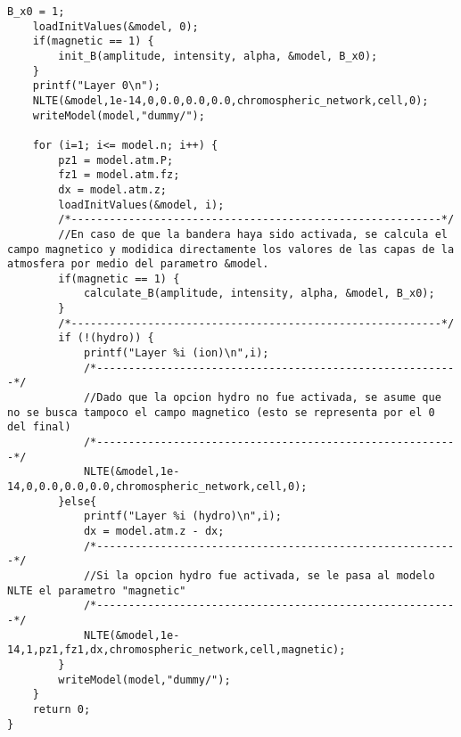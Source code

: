 \begin{lstlisting}[style=CStyle]
	B_x0 = 1;
	loadInitValues(&model, 0);
	if(magnetic == 1) {
		init_B(amplitude, intensity, alpha, &model, B_x0);
	}
	printf("Layer 0\n");
	NLTE(&model,1e-14,0,0.0,0.0,0.0,chromospheric_network,cell,0);
	writeModel(model,"dummy/");

	for (i=1; i<= model.n; i++) {
		pz1 = model.atm.P;
		fz1 = model.atm.fz;
		dx = model.atm.z;
		loadInitValues(&model, i);
		/*----------------------------------------------------------*/	
		//En caso de que la bandera haya sido activada, se calcula el campo magnetico y modidica directamente los valores de las capas de la atmosfera por medio del parametro &model.
		if(magnetic == 1) {
			calculate_B(amplitude, intensity, alpha, &model, B_x0);
		}
		/*----------------------------------------------------------*/	
		if (!(hydro)) {
			printf("Layer %i (ion)\n",i);
			/*---------------------------------------------------------*/	
			//Dado que la opcion hydro no fue activada, se asume que no se busca tampoco el campo magnetico (esto se representa por el 0 del final)
			/*---------------------------------------------------------*/	
			NLTE(&model,1e-14,0,0.0,0.0,0.0,chromospheric_network,cell,0);
		}else{
			printf("Layer %i (hydro)\n",i);
			dx = model.atm.z - dx;
			/*---------------------------------------------------------*/	
			//Si la opcion hydro fue activada, se le pasa al modelo NLTE el parametro "magnetic"
			/*---------------------------------------------------------*/	
			NLTE(&model,1e-14,1,pz1,fz1,dx,chromospheric_network,cell,magnetic);
		}
		writeModel(model,"dummy/");
	}
	return 0;
}
\end{lstlisting}

